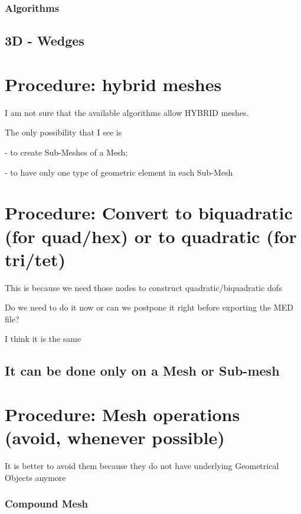 \documentclass[10pt]{book}
\begin{document}
   \subsection{Algorithms}
   
   
   

  \section{3D - Wedges}
  
 
  \chapter{Procedure: hybrid meshes}
  
  I am not sure that the available algorithms allow HYBRID meshes.
  
  The only possibility that I see is 
  
  - to create Sub-Meshes of a Mesh;
  
  - to have only one type of geometric element in each Sub-Mesh
  

 
 
  \chapter{Procedure: Convert to biquadratic (for quad/hex) or to quadratic (for tri/tet)}
  
  This is because we need those nodes to construct quadratic/biquadratic dofs
  
  Do we need to do it now or can we postpone it right before exporting the MED file?
  
  I think it is the same
  
  \section{It can be done only on a Mesh or Sub-mesh}
  
  
  
  
  \chapter{Procedure: Mesh operations (avoid, whenever possible)}
  
   It is better to avoid them because they do not have underlying Geometrical Objects anymore
   

   
\subsection{Compound Mesh}
   
\end{document}
